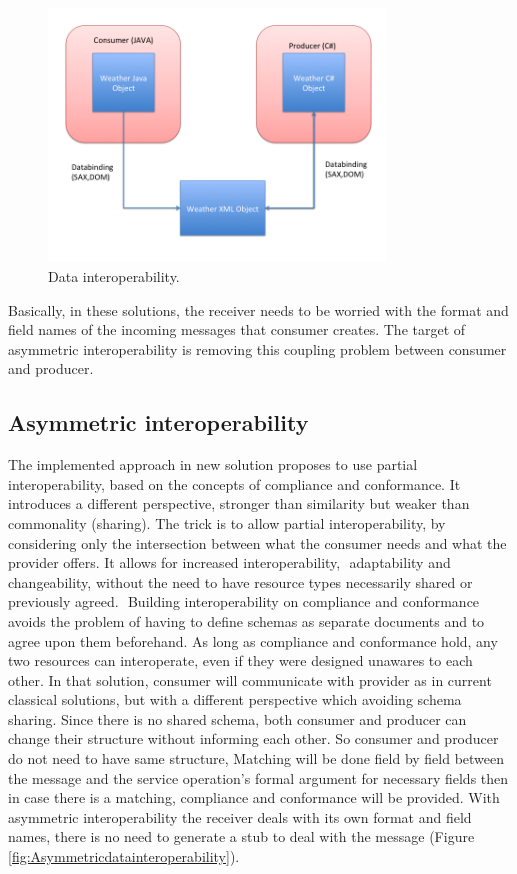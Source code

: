 \begin{figure}[!htb]
  \centering
  \includegraphics[width=0.8\textwidth]{Figures/databinding.png}
  \caption[Data interoperability.]{Data interoperability.}
  \label{fig:datainteroperability}
\end{figure}

Basically, in these solutions, the receiver needs to be worried with the format and field names of the incoming messages that consumer creates. The target of asymmetric interoperability is removing this coupling problem between consumer and producer.


\subsection{Asymmetric interoperability}
\label{section:asymmetricinteroperabilityProblem}

The implemented approach in new solution proposes to use partial interoperability, based on the concepts of compliance and conformance. It introduces a different perspective, stronger than similarity but weaker than commonality (sharing). The trick is to allow partial interoperability, by considering only the intersection between what the consumer needs and what the provider offers. It allows for increased interoperability,  adaptability and changeability, without the need to have resource types necessarily shared or previously agreed.  Building interoperability on compliance and conformance avoids the problem of having to define schemas as separate documents and to agree upon them beforehand. As long as compliance and conformance hold, any two resources can interoperate, even if they were designed unawares to each other. In that solution, consumer will communicate with provider as in current classical solutions, but with a different perspective which avoiding schema sharing. Since there is no shared schema, both consumer and producer can change their structure without informing each other. So consumer and producer do not need to have same structure, Matching will be done field by field between the message and the service operation’s formal argument for necessary fields then in case there is a matching, compliance and conformance will be provided. With asymmetric interoperability the receiver deals with its own format and field names, there is no need to generate a stub to deal with the message (Figure \ref{fig:Asymmetricdatainteroperability}).

